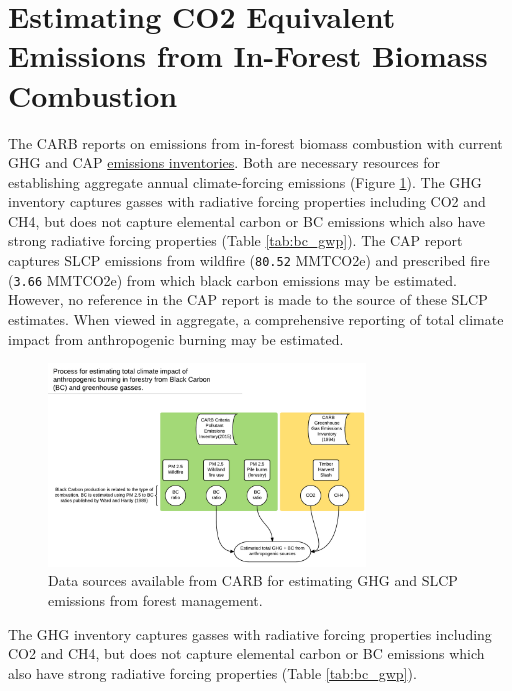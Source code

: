 \documentclass[a4paper]{article}
\begin{document}
\section{Estimating CO2 Equivalent Emissions from In-Forest Biomass Combustion}
\label{sec:orgheadline7}


The \ac{CARB} reports on emissions from in-forest biomass combustion with current \ac{GHG} and \ac{CAP} \href{http://www.arb.ca.gov/ei/ei.htm}{emissions inventories}. Both are necessary resources for establishing aggregate annual climate-forcing emissions (Figure \ref{fig:burn_diag}). 
The GHG inventory captures
gasses with radiative forcing properties including CO2 and CH4, but does not capture elemental
carbon or \ac{BC} emissions which also have strong radiative
forcing properties (Table \ref{tab:bc_gwp}). The \citet{CaliforniaAirResourcesBoard2015,CaliforniaAirResourcesBoard2016}
\ac{CAP} report captures \ac{SLCP} emissions from wildfire
(\texttt{80.52} MMTCO2e) and prescribed fire
(\texttt{3.66} MMTCO2e) from which black carbon emissions may be estimated. However, no reference in the CAP report is made to the source of these
SLCP estimates. When viewed in aggregate, a comprehensive reporting of total climate impact from anthropogenic burning may be estimated. 


\begin{figure}[htb]
\centering
\includegraphics[width=0.75\textwidth]{./graphics/burning.pdf}
\caption{Data sources available from CARB for estimating \ac{GHG} and \ac{SLCP} emissions from forest management. \label{fig:burn_diag}}
\end{figure}

The \ac{GHG} inventory captures
gasses with radiative forcing properties including CO2 and CH4, but does not capture elemental
carbon or \ac{BC} emissions which also have strong radiative
forcing properties (Table \ref{tab:bc_gwp}). 
\end{document}
